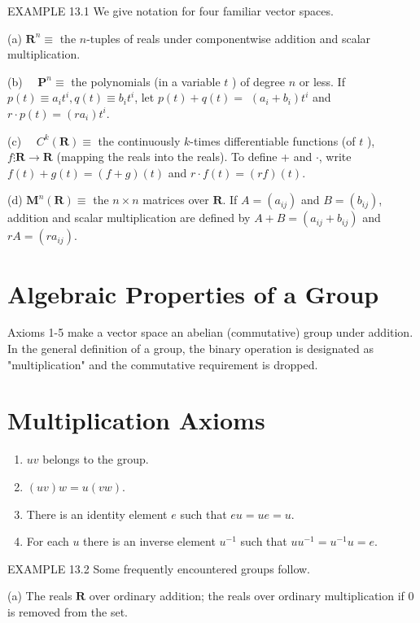 \documentclass[10pt]{article}
\begin{document}
EXAMPLE 13.1 We give notation for four familiar vector spaces.

(a) $\mathbf{R}^{n} \equiv$ the $n$-tuples of reals under componentwise addition and scalar multiplication.

(b) $\quad \mathbf{P}^{n} \equiv$ the polynomials (in a variable $t$ ) of degree $n$ or less. If $p(t) \equiv a_{i} t^{i}, q(t) \equiv b_{i} t^{i}$, let $p(t)+q(t)=$ $\left(a_{i}+b_{i}\right) t^{i}$ and $r \cdot p(t)=\left(r a_{i}\right) t^{i}$.

(c) $\quad C^{k}(\mathbf{R}) \equiv$ the continuously $k$-times differentiable functions (of $t$ ), $f \vdots \mathbf{R} \rightarrow \mathbf{R}$ (mapping the reals into the reals). To define + and $\cdot$, write $f(t)+g(t)=(f+g)(t)$ and $r \cdot f(t)=(r f)(t)$.

(d) $\mathbf{M}^{n}(\mathbf{R}) \equiv$ the $n \times n$ matrices over $\mathbf{R}$. If $A=\left(a_{i j}\right)$ and $B=\left(b_{i j}\right)$, addition and scalar multiplication are defined by $A+B=\left(a_{i j}+b_{i j}\right)$ and $r A=\left(r a_{i j}\right)$.

\section*{Algebraic Properties of a Group}
Axioms 1-5 make a vector space an abelian (commutative) group under addition. In the general definition of a group, the binary operation is designated as "multiplication" and the commutative requirement is dropped.

\section*{Multiplication Axioms}
\begin{enumerate}
  \item $u v$ belongs to the group.

  \item $(u v) w=u(v w)$.

  \item There is an identity element $e$ such that $e u=u e=u$.

  \item For each $u$ there is an inverse element $u^{-1}$ such that $u u^{-1}=u^{-1} u=e$.

\end{enumerate}

EXAMPLE 13.2 Some frequently encountered groups follow.

(a) The reals $\mathbf{R}$ over ordinary addition; the reals over ordinary multiplication if 0 is removed from the set.
\end{document}

